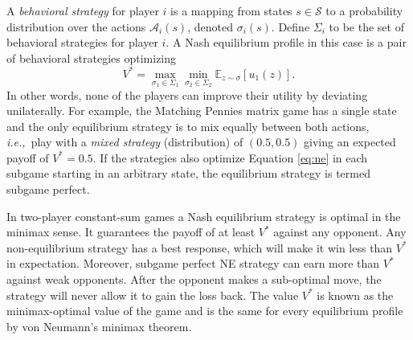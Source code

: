 \documentclass[conference]{IEEEtran}
\newcommand{\bE}{\mathbb{E}}
\newcommand{\cA}{\mathcal{A}}
\newcommand{\cS}{\mathcal{S}}
\newcommand{\cT}{\mathcal{T}}
\newcommand{\ie}{{\it i.e.,}~}
\begin{document}
A {\it behavioral strategy} for player $i$ is a mapping from states $s \in \cS$
to a probability distribution over the actions $\cA_i(s)$, denoted $\sigma_i(s)$. 
Define $\Sigma_i$ to be the set of behavioral 
strategies for player $i$. A Nash equilibrium profile in this case is a pair of behavioral strategies optimizing
\begin{equation}\label{eq:ne}
V^* = \max_{\sigma_1 \in \Sigma_1} \min_{\sigma_2 \in \Sigma_2} \bE_{z \sim \sigma}[u_1(z)].
\end{equation}
In other words, none of the players can improve their utility by deviating unilaterally. 
For example, the Matching Pennies matrix game has a single state and the only equilibrium strategy is to mix equally between both actions, \ie play with a {\it mixed strategy} (distribution) of $(0.5, 0.5)$ giving an expected payoff of $V^* = 0.5$. 
If the strategies also optimize Equation \ref{eq:ne} in each subgame starting in an arbitrary state, the equilibrium strategy is termed subgame perfect.

In two-player constant-sum games a Nash equilibrium strategy is optimal in the minimax sense. It guarantees the payoff of at least $V^*$ against any opponent. Any 
non-equilibrium strategy has a best response, which will make it win less than $V^*$ in expectation. Moreover, subgame perfect NE strategy can earn more 
than $V^*$ against weak opponents. After the opponent makes a sub-optimal move, the strategy will never allow it to gain the loss back. 
The value $V^*$ is known as the minimax-optimal value of the game and is the same for every equilibrium profile by von Neumann's minimax theorem.

\end{document}
